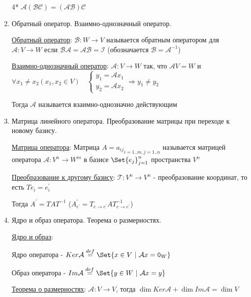 \documentclass[12pt]{article}
\begin{document}
\begin{enumerate}
        4* $\mathcal{A} (\mathcal{B}\mathcal{C}) = (\mathcal{A}\mathcal{B}) \mathcal{C}$


        \item Обратный оператор. Взаимно-однозначный оператор.

        \hyperlink{reverselinearoperator}{Обратный оператор}: $\mathcal{B} : W \rightarrow V$ называется обратным оператором для $\mathcal{A} : V \rightarrow W$
        если $\mathcal{B}\mathcal{A} = \mathcal{A}\mathcal{B} = \mathcal{I}$ (обозначается $\mathcal{B} = \mathcal{A}^{-1}$)

        \hyperlink{onetoonelinearoperator}{Взаимно-однозначный оператор}: $\mathcal{A} : V \rightarrow W$ так, что $\mathcal{A}V = W$ и $\forall x_1 \neq x_2 (x_1, x_2 \in V) \quad
        \begin{cases}y_1 = \mathcal{A}x_1 \\ y_2 = \mathcal{A}x_2\end{cases} \Longrightarrow y_1 \neq y_2$

        Тогда $\mathcal{A}$ называется взаимно-однозначно действующим

        \item Матрица линейного оператора. Преобразование матрицы при переходе к новому базису.

        \hyperlink{operatorsmatrix}{Матрица оператора}: Матрица $A = {a_{ij}}_{i=1..m, j=1..n}$ называется матрицей оператора $\mathcal{A} : V^n \rightarrow W^m$ в базисе $\Set{e_j}^n_{j=1}$ пространства $V^n$

        \hyperlink{transformationtodifferentbasis}{Преобразование к другому базису}:     $\mathcal{T} : V^n \rightarrow V^n$ - преобразование координат, то есть $Te_i = e^\prime_i$

        Тогда $A^\prime = TAT^{-1}$ ($A^\prime_{e^\prime} = T_{e\to e^\prime}AT^{-1}_{e\to e^\prime}$)

        \item Ядро и образ оператора. Теорема о размерностях.

        \hyperlink{kernalandimageofoperator}{Ядро и образ}:

        Ядро оператора - $Ker \mathcal{A} \stackrel{def}{=} \Set{x \in V \ | \ \mathcal{A}x = \texttt{0}_W}$

        Образ оператора - $Im \mathcal{A} \stackrel{def}{=} \Set{y \in W \ | \ \mathcal{A}x = y}$

        \hyperlink{theoremaboutdimensions}{Теорема о размерностях}: $\mathcal{A} : V \rightarrow V$, тогда $\dim Ker \mathcal{A} + \dim Im \mathcal{A} = \dim V$



\end{enumerate}
\end{document}
